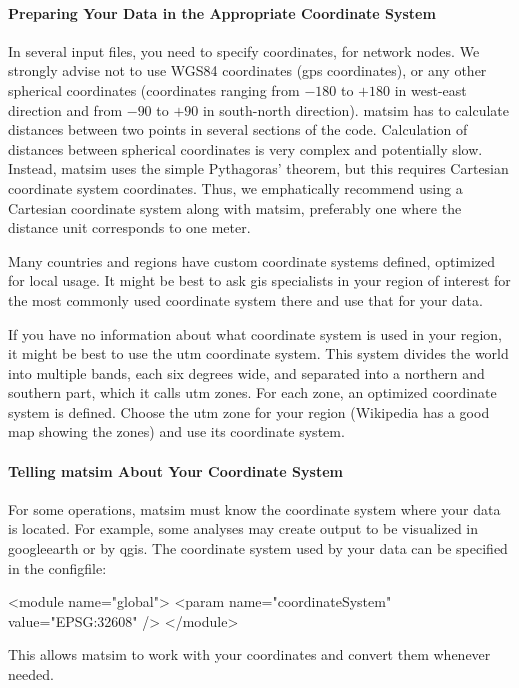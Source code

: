 \paragraph{Preparing Your Data in the Appropriate Coordinate System}
In several input files, you need to specify coordinates, \eg for network nodes. We strongly advise not to use WGS84 coordinates (\ie \gls{gps} coordinates), or any other spherical coordinates (coordinates ranging from $-180$ to $+180$ in west-east direction and from $-90$ to $+90$ in south-north direction). \gls{matsim} has to calculate distances between two points in several sections of the code. Calculation of distances between spherical coordinates is very complex and potentially slow. Instead, \gls{matsim} uses the simple Pythagoras' theorem, but this requires Cartesian coordinate system coordinates. Thus, we emphatically recommend using a Cartesian coordinate system along with \gls{matsim}, preferably one where the distance unit corresponds to one meter.

Many countries and regions have custom coordinate systems defined, optimized for local usage. It might be best to ask  \gls{gis} specialists in your region of interest for the most commonly used coordinate system there and use that for your data.

If you have no information
about what
coordinate system is used in your region, it might be best to use the \gls{utm} coordinate system. This  system divides the world into multiple bands, each six degrees wide, and separated into a northern and southern part, which it calls \gls{utm} zones. For each zone, an optimized coordinate system is defined. Choose the \gls{utm} zone for your region (Wikipedia has a good map showing the zones) and use its coordinate system. 

\paragraph{Telling \protect\gls{matsim} About Your Coordinate System}
For some operations, \gls{matsim} must know the coordinate system where your data is located. For example, some analyses may create output to be visualized in \gls{googleearth} or by \gls{qgis}.
The coordinate system used by your data can be specified in the \gls{configfile}:
\begin{xml}
<module name="global"> 
   <param name="coordinateSystem" value="EPSG:32608" /> 
</module>
\end{xml}
This allows \gls{matsim} to work with your coordinates and convert them whenever needed. 

